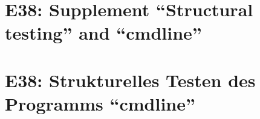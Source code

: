 

\thispagestyle{empty}
\ifenglish
\section*{E38: Supplement ``Structural testing'' and ``cmdline''}

\fi
\ifgerman
\section*{E38: Strukturelles Testen des Programms "`cmdline"'}

\fi


